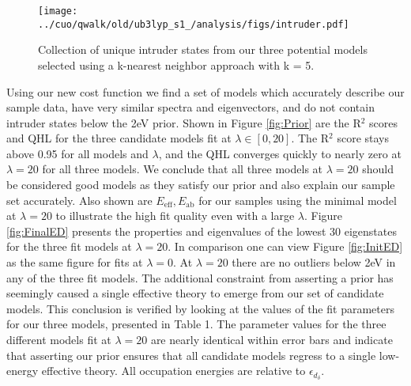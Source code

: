 \documentclass[12pt]{article}
\begin{document}
\begin{figure}[H]
\begin{center}
\texttt{[image: ../cuo/qwalk/old/ub3lyp\_s1\_/analysis/figs/intruder.pdf]}
\end{center}
\caption{Collection of unique intruder states from our three potential models selected using a k-nearest neighbor approach with k = 5.}
\label{fig:Intruder}
\end{figure}

Using our new cost function we find a set of models which accurately describe our sample data, have very similar spectra and eigenvectors, and do not contain intruder states below the 2eV prior. 
Shown in Figure \ref{fig:Prior} are the R$^2$ scores and QHL for the three candidate models fit at $\lambda \in [0,20]$. 
The R$^2$ score stays above 0.95 for all models and $\lambda$, and the QHL converges quickly to nearly zero at $\lambda = 20$ for all three models. 
We conclude that all three models at $\lambda = 20$ should be considered good models as they satisfy our prior and also explain our sample set accurately. 
Also shown are $E_\text{eff}, E_\text{ab}$ for our samples using the minimal model at $\lambda = 20$ to illustrate the high fit quality even with a large $\lambda$.
Figure \ref{fig:FinalED} presents the properties and eigenvalues of the lowest 30 eigenstates for the three fit models at $\lambda = 20$. 
In comparison one can view Figure \ref{fig:InitED} as the same figure for fits at $\lambda = 0$. 
At $\lambda = 20$ there are no outliers below 2eV in any of the three fit models. 
The additional constraint from asserting a prior has seemingly caused a single effective theory to emerge from our set of candidate models.
This conclusion is verified by looking at the values of the fit parameters for our three models, presented in Table 1.
The parameter values for the three different models fit at $\lambda = 20$ are nearly identical within error bars and indicate that asserting our prior ensures that all candidate models regress to a single low-energy effective theory.
All occupation energies are relative to $\epsilon_{d_\delta}$.
\end{document}
